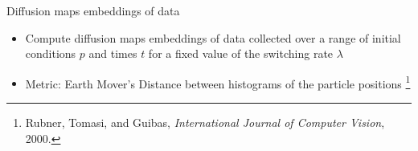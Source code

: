 \documentclass[12pt]{beamer}
\begin{document}
\begin{frame}{Diffusion maps embeddings of data}

{\scriptsize
\begin{itemize}

\item Compute diffusion maps embeddings of data collected over a range of initial conditions $p$ and times $t$ for a fixed value of the switching rate $\lambda$ \par
\item Metric: Earth Mover's Distance between histograms of the particle positions \footnote{Rubner, Tomasi, and Guibas, {\em International Journal of Computer Vision}, 2000.} \par

\end{itemize}
 }

\centering

\def\figwidth{0.9in}

\end{frame}
\end{document}
